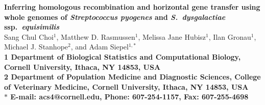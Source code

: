 \documentclass[10pt]{article}
\date{}
\begin{document}
\begin{flushleft}
{\Large
\textbf{Inferring homologous recombination and horizontal gene transfer 
using whole genomes of \textit{Streptococcus pyogenes} 
and\textit{ S.\ dysgalactiae} ssp.\textit{\ equisimilis}}
}
\\
Sang Chul Choi$^{1}$, Matthew D. Rasmussen$^{1}$, 
Melissa Jane Hubisz$^{1}$, Ilan Gronau$^{1}$,
Michael J. Stanhope$^{2}$, and Adam Siepel$^{1,\ast}$
\\
\bf{1} 
Department of Biological Statistics and Computational Biology,
Cornell University, Ithaca, NY 14853, USA
\\
\bf{2}
Department of Population Medicine and Diagnostic Sciences,
College of Veterinary Medicine, Cornell University, Ithaca, NY 14853, USA
\\
$\ast$ E-mail: acs4@cornell.edu, Phone: 607-254-1157, Fax: 607-255-4698
\end{flushleft}
\end{document}
